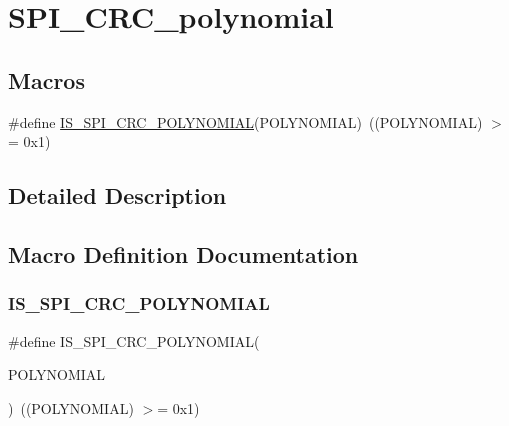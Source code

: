 \hypertarget{group___s_p_i___c_r_c__polynomial}{}\section{S\+P\+I\+\_\+\+C\+R\+C\+\_\+polynomial}
\label{group___s_p_i___c_r_c__polynomial}
\subsection*{Macros}
\begin{DoxyCompactItemize}
\item 
\#define \mbox{\hyperlink{group___s_p_i___c_r_c__polynomial_ga76eec5bbb44c873aa52966a9cb6c8f8c}{I\+S\+\_\+\+S\+P\+I\+\_\+\+C\+R\+C\+\_\+\+P\+O\+L\+Y\+N\+O\+M\+I\+AL}}(P\+O\+L\+Y\+N\+O\+M\+I\+AL)~((P\+O\+L\+Y\+N\+O\+M\+I\+AL) $>$= 0x1)
\end{DoxyCompactItemize}


\subsection{Detailed Description}


\subsection{Macro Definition Documentation}
\mbox{\label{group___s_p_i___c_r_c__polynomial_ga76eec5bbb44c873aa52966a9cb6c8f8c}} 
\subsubsection{\texorpdfstring{IS\_SPI\_CRC\_POLYNOMIAL}{IS\_SPI\_CRC\_POLYNOMIAL}}
{\footnotesize\ttfamily \#define I\+S\+\_\+\+S\+P\+I\+\_\+\+C\+R\+C\+\_\+\+P\+O\+L\+Y\+N\+O\+M\+I\+AL(\begin{DoxyParamCaption}\item[{}]{P\+O\+L\+Y\+N\+O\+M\+I\+AL }\end{DoxyParamCaption})~((P\+O\+L\+Y\+N\+O\+M\+I\+AL) $>$= 0x1)}

